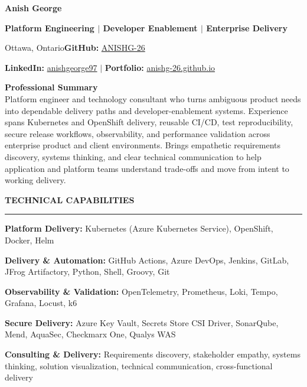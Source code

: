 \documentclass[11pt]{article}
\newcommand{\TwoColLine}[2]{\noindent #1\hfill #2\par}
\newcommand{\ResumeSection}[1]{\vspace{5pt}\begin{center}\textbf{\MakeUppercase{#1}}\\[-4pt]\rule{0.98\textwidth}{0.6pt}\end{center}\vspace{1pt}}
\newlength{\BulletIndent}
\newenvironment{ResumeItems}{\begin{list}{\textbullet}{\setlength{\leftmargin}{\BulletIndent}\setlength{\labelwidth}{0.8em}\setlength{\labelsep}{0.5em}\setlength{\itemindent}{0pt}\setlength{\itemsep}{0.5pt}\setlength{\parsep}{0pt}\setlength{\topsep}{0pt}\setlength{\partopsep}{0pt}}}{\par\end{list}}
\newcommand{\PB}[1]{\par\item #1}
\begin{document}
{\fontsize{20pt}{20pt}\selectfont\bfseries Anish George}\par
\vspace{2pt}
\TwoColLine{\textbf{Platform Engineering $\mid$ Developer Enablement $\mid$ Enterprise Delivery}}{}
\TwoColLine{Ottawa, Ontario}{\textbf{GitHub:} \href{https://github.com/ANISHG-26}{ANISHG-26}}
\TwoColLine{}{\textbf{LinkedIn:} \href{https://www.linkedin.com/in/anishgeorge97}{anishgeorge97} $\mid$ \textbf{Portfolio:} \href{https://anishg-26.github.io/}{anishg-26.github.io}}

\vspace{5pt}
\textbf{Professional Summary}\\
Platform engineer and technology consultant who turns ambiguous product needs into
dependable delivery paths and developer-enablement systems. Experience spans
Kubernetes and OpenShift delivery, reusable CI/CD, test reproducibility, secure
release workflows, observability, and performance validation across enterprise
product and client environments. Brings empathetic requirements discovery, systems
thinking, and clear technical communication to help application and platform teams
understand trade-offs and move from intent to working delivery.
\par

\ResumeSection{Technical Capabilities}
\begin{ResumeItems}
\PB{\textbf{Platform Delivery:} Kubernetes (Azure Kubernetes Service), OpenShift, Docker, Helm}
\PB{\textbf{Delivery \& Automation:} GitHub Actions, Azure DevOps, Jenkins, GitLab, JFrog Artifactory, Python, Shell, Groovy, Git}
\PB{\textbf{Observability \& Validation:} OpenTelemetry, Prometheus, Loki, Tempo, Grafana, Locust, k6}
\PB{\textbf{Secure Delivery:} Azure Key Vault, Secrets Store CSI Driver, SonarQube, Mend, AquaSec, Checkmarx One, Qualys WAS}
\PB{\textbf{Consulting \& Delivery:} Requirements discovery, stakeholder empathy, systems thinking, solution visualization, technical communication, cross-functional delivery}
\end{ResumeItems}
\end{document}
